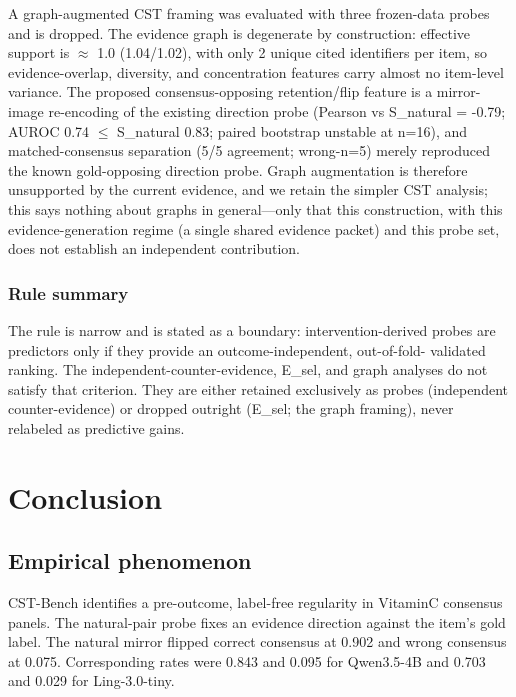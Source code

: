 \documentclass[11pt]{article}
\begin{document}
A graph-augmented CST framing was evaluated with three frozen-data probes and is dropped. The evidence graph is degenerate by construction: effective support is $\approx$ 1.0 (1.04/1.02), with only 2 unique cited identifiers per item, so evidence-overlap, diversity, and concentration features carry almost no item-level variance. The proposed consensus-opposing retention/flip feature is a mirror-image re-encoding of the existing direction probe (Pearson vs S\_\allowbreak{}natural = -0.79; AUROC 0.74 $\leq$ S\_\allowbreak{}natural 0.83; paired bootstrap unstable at n=16), and matched-consensus separation (5/5 agreement; wrong-n=5) merely reproduced the known gold-opposing direction probe. Graph augmentation is therefore unsupported by the current evidence, and we retain the simpler CST analysis; this says nothing about graphs in general---only that this construction, with this evidence-generation regime (a single shared evidence packet) and this probe set, does not establish an independent contribution.

\subsubsection{Rule summary}

The rule is narrow and is stated as a boundary: intervention-derived probes are predictors only if they provide an outcome-independent, out-of-fold- validated ranking. The independent-counter-evidence, E\_\allowbreak{}sel, and graph analyses do not satisfy that criterion. They are either retained exclusively as probes (independent counter-evidence) or dropped outright (E\_\allowbreak{}sel; the graph framing), never relabeled as predictive gains.

\section{Conclusion}

\subsection{Empirical phenomenon}

CST-Bench identifies a pre-outcome, label-free regularity in VitaminC consensus panels. The natural-pair probe fixes an evidence direction against the item's gold label. The natural mirror flipped correct consensus at 0.902 and wrong consensus at 0.075. Corresponding rates were 0.843 and 0.095 for Qwen3.5-4B and 0.703 and 0.029 for Ling-3.0-tiny.
\end{document}
